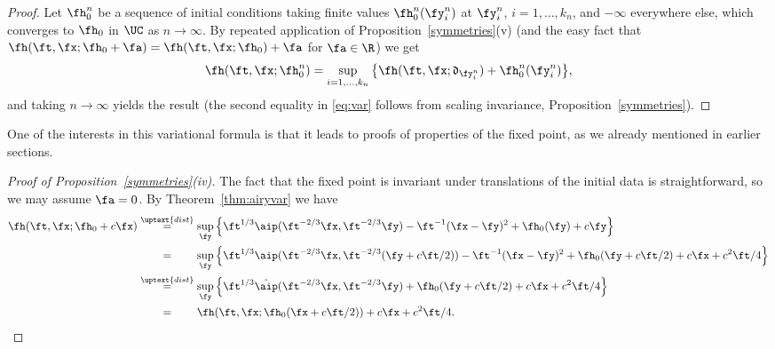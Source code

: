 \documentclass[]{pcmi}
\theoremstyle{plain}
\theoremstyle{definition}
\begin{document}
\begin{proof}
Let $\fh_0^{n}$ be a sequence of initial conditions taking finite values $\fh^n_0(\fy^n_i)$ at $\fy^n_i$, $i=1,\ldots, k_n$, and $-\infty$ everywhere else, which converges to $\fh_0$ in $\UC$ as $n\to\infty$.
By repeated application of Proposition~\ref{symmetries}(v) (and the easy fact that $\fh(\ft,\fx;\fh_0+\fa)=\fh(\ft,\fx;\fh_0)+\fa$ for $\fa\in\R$) we get
\[\fh(\ft,\fx;\fh^n_0)=\sup_{i=1,\ldots,k_n}\big\{\fh(\ft,\fx;\mathfrak{d}_{\fy^n_i})+\fh^n_0(\fy^n_i)\big\},\]
and taking $n\to\infty$ yields the result (the second equality in \eqref{eq:var} follows from scaling invariance, Proposition~\ref{symmetries}).
\end{proof}

One of the interests in this variational formula is that it leads to proofs of properties of the fixed point, as we already mentioned in earlier sections.

\begin{proof}[Proof of Proposition~\ref{symmetries}(iv)]
The fact that the fixed point is invariant under translations of the initial data is straightforward, so we may assume $\fa=0$.
By Theorem~\ref{thm:airyvar} we have
\begin{align*}
\fh(\ft,\fx;\fh_0+c\fx)&\stackrel{\uptext{dist}}{=}\sup_\fy\Big\{ \ft^{1/3}\aip(\ft^{-2/3} \fx,\ft^{-2/3} \fy)-\ft^{-1}(\fx-\fy)^2 + \fh_0(\fy)+c\fy\Big\}\\
&\stackrel{\hphantom{\uptext{dist}}}{=}\sup_\fy\Big\{ \ft^{1/3}\aip(\ft^{-2/3} \fx,\ft^{-2/3}(\fy+c\ft/2))-\ft^{-1}(\fx-\fy)^2 + \fh_0(\fy+c\ft/2)+c\fx+c^2\ft/4\Big\}\\
&\stackrel{\uptext{dist}}{=}\sup_\fy\Big\{ \ft^{1/3}\hat\aip(\ft^{-2/3} \fx,\ft^{-2/3}\fy)+\fh_0(\fy+c\ft/2)+c\fx+c^2\ft/4\Big\}\\
&\stackrel{\hphantom{\uptext{dist}}}{=}\fh(\ft,\fx;\fh_0(\fx+c\ft/2))+c\fx+c^2\ft/4.\qedhere
\end{align*}
\end{proof}
\end{document}
